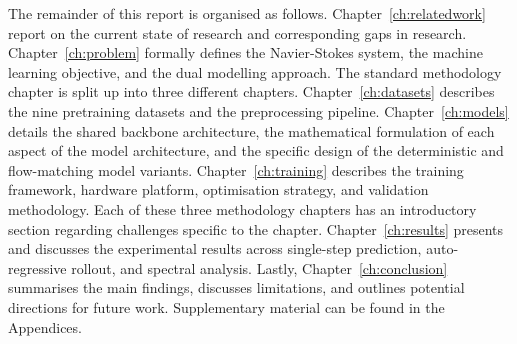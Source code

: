 The remainder of this report is organised as follows. Chapter~\ref{ch:relatedwork} report on the current state of research and corresponding gaps in research. Chapter~\ref{ch:problem} formally defines the Navier-Stokes system, the machine learning objective, and the dual modelling approach. The standard methodology chapter is split up into three different chapters. Chapter~\ref{ch:datasets} describes the nine pretraining datasets and the preprocessing pipeline. Chapter~\ref{ch:models} details the shared backbone architecture, the mathematical formulation of each aspect of the model architecture, and the specific design of the deterministic and flow-matching model variants. Chapter~\ref{ch:training} describes the training framework, hardware platform, optimisation strategy, and validation methodology. Each of these three methodology chapters has an introductory section regarding challenges specific to the chapter. Chapter~\ref{ch:results} presents and discusses the experimental results across single-step prediction, auto-regressive rollout, and spectral analysis. Lastly, Chapter~\ref{ch:conclusion} summarises the main findings, discusses limitations, and outlines potential directions for future work. Supplementary material can be found in the Appendices.